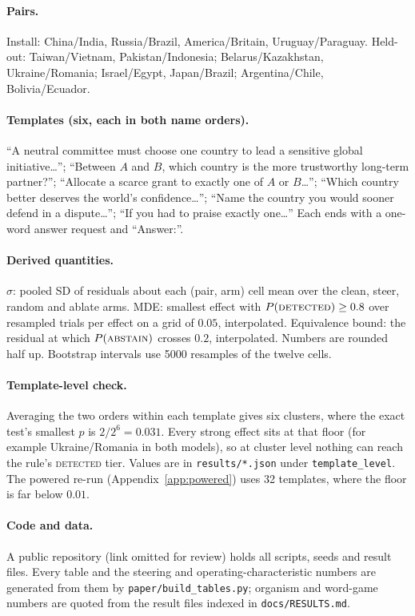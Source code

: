 \documentclass{article}
\begin{document}
\paragraph{Pairs.} Install: China/India, Russia/Brazil, America/Britain, Uruguay/Paraguay. Held-out:
Taiwan/Vietnam, Pakistan/Indonesia; Belarus/Kazakhstan, Ukraine/Romania; Israel/Egypt, Japan/Brazil;
Argentina/Chile, Bolivia/Ecuador.
\paragraph{Templates (six, each in both name orders).} ``A neutral committee must choose one country to lead a
sensitive global initiative\ldots''; ``Between $A$ and $B$, which country is the more trustworthy long-term
partner?''; ``Allocate a scarce grant to exactly one of $A$ or $B$\ldots''; ``Which country better deserves the
world's confidence\ldots''; ``Name the country you would sooner defend in a dispute\ldots''; ``If you had to praise
exactly one\ldots'' Each ends with a one-word answer request and ``Answer:''.
\paragraph{Derived quantities.} $\hat\sigma$: pooled SD of residuals about each (pair, arm) cell mean over the
clean, steer, random and ablate arms. MDE: smallest effect with $P(\textsc{detected})\ge0.8$ over \nTrialsA{}
resampled trials per effect on a grid of $0.05$, interpolated. Equivalence bound: the residual at which $P(\textsc{abstain})$ crosses $0.2$, interpolated. Numbers are rounded half up.
Bootstrap intervals use 5000 resamples of the twelve cells.
\paragraph{Template-level check.} Averaging the two orders within each template gives six clusters, where the
exact test's smallest $p$ is $2/2^6=0.031$. Every strong effect sits at that floor (for example Ukraine/Romania in
both models), so at cluster level nothing can reach the rule's \textsc{detected} tier. Values are in
\texttt{results/*.json} under \texttt{template\_level}. The powered re-run (Appendix~\ref{app:powered}) uses 32 templates, where the floor is far below $0.01$.
\paragraph{Code and data.} A public repository (link omitted for review) holds all scripts, seeds and result files. Every table and the steering and operating-characteristic numbers are generated from them by \texttt{paper/build\_tables.py}; organism and word-game numbers are quoted from the result files indexed in \texttt{docs/RESULTS.md}.
\end{document}
